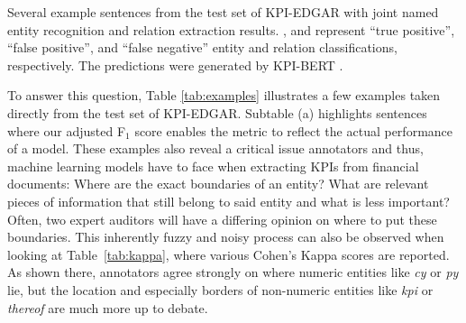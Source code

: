 \documentclass[conference, table]{IEEEtran}
\newcommand{\1} {\mathbbm{1}}
\begin{document}
\begin{table}[t]
 \caption{Several example sentences from the test set of KPI-EDGAR with joint named entity recognition and relation extraction results. {\color{fhgreen}{Green}}, {\color{blue}{Blue}} and {\color{orange}{Orange}} represent ``true positive'', ``false positive'', and ``false negative'' entity and relation classifications, respectively. The predictions were generated by KPI-BERT \cite{kpi-bert}.
}
\label{tab:examples}
\end{table}

To answer this question, Table \ref{tab:examples} illustrates a few examples taken directly from the test set of KPI-EDGAR. Subtable (a) highlights sentences where our adjusted F$_1$ score enables the metric to reflect the actual performance of a model. These examples also reveal a critical issue annotators and thus, machine learning models have to face when extracting KPIs from financial documents: Where are the exact boundaries of an entity? What are relevant pieces of information that still belong to said entity and what is less important? Often, two expert auditors will have a differing opinion on where to put these boundaries. 
This inherently fuzzy and noisy process can also be observed when looking at Table~\ref{tab:kappa}, where various Cohen's Kappa scores are reported. As shown there, annotators agree strongly on where numeric entities like \textit{cy} or \textit{py} lie, but the location and especially borders of non-numeric entities like \textit{kpi} or \textit{thereof} are much more up to debate. 
\end{document}
